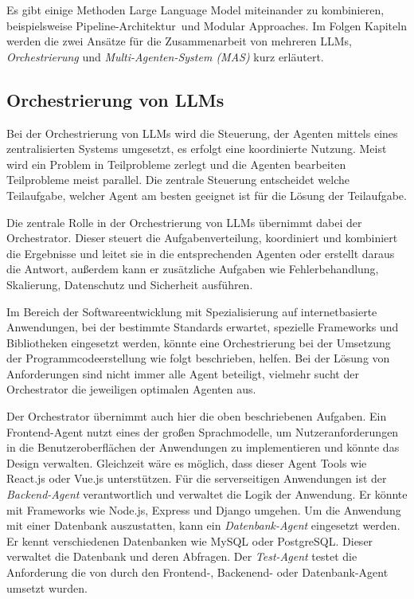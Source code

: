 Es gibt einige Methoden Large Language Model miteinander zu kombinieren, beispielsweise \glqq Pipeline-Architektur\grqq \ und \glqq Modular Approaches\grqq . Im Folgen Kapiteln werden die zwei Ansätze für die Zusammenarbeit von mehreren LLMs, \textit{Orchestrierung} und \textit{Multi-Agenten-System (MAS)} kurz erläutert.

\subsection{Orchestrierung von LLMs}
Bei der Orchestrierung von LLMs wird die Steuerung, der Agenten mittels eines zentralisierten Systems umgesetzt, es erfolgt eine koordinierte Nutzung. Meist wird ein Problem in Teilprobleme zerlegt und die Agenten bearbeiten Teilprobleme meist parallel. Die zentrale Steuerung entscheidet welche Teilaufgabe, welcher Agent am besten geeignet ist für die Lösung der Teilaufgabe.\vspace{0.2cm}

Die zentrale Rolle in der Orchestrierung von LLMs übernimmt dabei der Orchestrator. Dieser steuert die Aufgabenverteilung, koordiniert und kombiniert die Ergebnisse und leitet sie in die entsprechenden Agenten oder erstellt daraus die Antwort, außerdem kann er zusätzliche Aufgaben wie Fehlerbehandlung, Skalierung, Datenschutz und Sicherheit ausführen.\vspace{0.2cm}

Im Bereich der Softwareentwicklung mit Spezialisierung auf internetbasierte Anwendungen, bei der bestimmte Standards erwartet, spezielle Frameworks und Bibliotheken eingesetzt werden, könnte eine Orchestrierung bei der Umsetzung der Programmcodeerstellung wie folgt beschrieben, helfen. Bei der Lösung von Anforderungen sind nicht immer alle Agent beteiligt, vielmehr sucht der Orchestrator die jeweiligen optimalen Agenten aus.\vspace{0.2cm}

Der Orchestrator übernimmt auch hier die oben beschriebenen Aufgaben. Ein Frontend-Agent nutzt eines der großen Sprachmodelle, um Nutzeranforderungen in die Benutzeroberflächen der Anwendungen zu implementieren und könnte das Design verwalten. Gleichzeit wäre es möglich, dass dieser Agent Tools wie React.js oder Vue.js unterstützen. Für die serverseitigen Anwendungen ist der \textit{Backend-Agent} verantwortlich und verwaltet die Logik der Anwendung. Er könnte mit Frameworks wie Node.js, Express und Django umgehen. Um die Anwendung mit einer Datenbank auszustatten, kann ein \textit{Datenbank-Agent} eingesetzt werden. Er kennt verschiedenen Datenbanken wie MySQL oder PostgreSQL. Dieser verwaltet die Datenbank und deren Abfragen. Der \textit{Test-Agent} testet die Anforderung die von durch den Frontend-, Backenend- oder Datenbank-Agent umsetzt wurden.\vspace{0.2cm}

